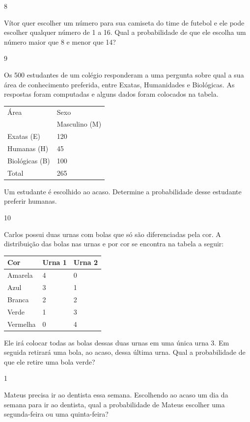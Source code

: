 \begin{escolha}
\num{8}

Vítor quer escolher um número para sua camiseta do time de futebol e ele
pode escolher qualquer número de 1 a 16. Qual a probabilidade de que ele
escolha um número maior que 8 e menor que 14?


\num{9}

Os 500 estudantes de um colégio responderam a uma pergunta sobre qual a
sua área de conhecimento preferida, entre Exatas, Humanidades e
Biológicas. As respostas foram computadas e alguns dados foram colocados
na tabela.

\begin{longtable}[]{@{}ll@{}}
\toprule
Área & Sexo\tabularnewline
& Masculino (M)\tabularnewline
Exatas (E) & 120\tabularnewline
Humanas (H) & 45\tabularnewline
Biológicas (B) & 100\tabularnewline
Total & 265\tabularnewline
\bottomrule
\end{longtable}

Um estudante é escolhido ao acaso. Determine a probabilidade desse
estudante preferir humanas.


\num{10}

Carlos possui duas urnas com bolas que só são diferenciadas pela cor. A
distribuição das bolas nas urnas e por cor se encontra na tabela a
seguir:

\begin{longtable}[]{@{}lll@{}}
\toprule
Cor & Urna 1 & Urna 2\tabularnewline
\midrule
\endhead
Amarela & 4 & 0\tabularnewline
Azul & 3 & 1\tabularnewline
Branca & 2 & 2\tabularnewline
Verde & 1 & 3\tabularnewline
Vermelha & 0 & 4\tabularnewline
\bottomrule
\end{longtable}

Ele irá colocar todas as bolas dessas duas urnas em uma única urna 3. Em
seguida retirará uma bola, ao acaso, dessa última urna. Qual a
probabilidade de que ele retire uma bola verde?



\num{1}

Mateus precisa ir ao dentista essa semana. Escolhendo ao acaso um dia da
semana para ir ao dentista, qual a probabilidade de Mateus escolher uma
segunda-feira ou uma quinta-feira?


\end{escolha}
